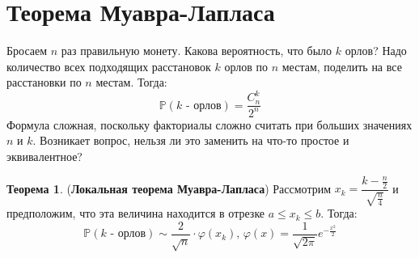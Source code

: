 \documentclass[12pt]{article}
\theoremstyle{definition}
\newtheorem{theorem}{Теорема}
\begin{document}
\section*{Теорема Муавра-Лапласа}
Бросаем $n$ раз правильную монету. Какова вероятность, что было $k$ орлов? Надо количество всех подходящих расстановок $k$ орлов по $n$ местам, поделить на все расстановки по $n$ местам. Тогда:
$$
	\mathbb{P}(\text{$k$ - орлов}) = \dfrac{C_n^k}{2^n}
$$
Формула сложная, поскольку факториалы сложно считать при больших значениях $n$ и $k$. Возникает вопрос, нельзя ли это заменить на что-то простое и эквивалентное?
\begin{theorem}(\textbf{Локальная теорема Муавра-Лапласа})
	Рассмотрим $x_k = \dfrac{k - \tfrac{n}{2}}{\sqrt{\tfrac{n}{4}}}$ и предположим, что эта величина находится в отрезке $a \leq x_k \leq b$. Тогда:
	$$
		\mathbb{P}(\text{$k$ - орлов}) \sim \dfrac{2}{\sqrt{n}}{\cdot}\varphi(x_k), \, \varphi(x) = \dfrac{1}{\sqrt{2\pi}}e^{-\tfrac{x^2}{2}}
	$$
\end{theorem}
\end{document}
